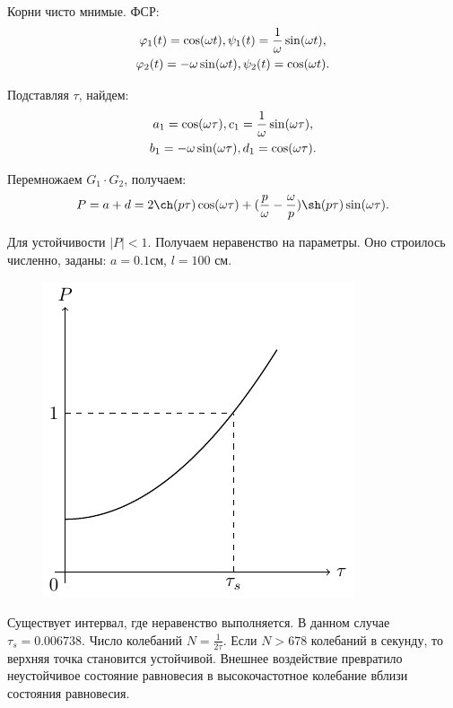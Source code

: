 Корни чисто мнимые. ФСР:
\begin{gather*}
	\phi_1(t)=\cos(\omega t), \psi_1(t)=\frac1{\omega}\sin(\omega t), \notag \\ 
	\phi_2(t)=-\omega \sin(\omega t), \psi_2(t)=\cos(\omega t).		
\end{gather*}

Подставляя $\tau$, найдем:
\begin{gather*}
	a_1=\cos(\omega \tau), c_1=\frac1{\omega}\sin(\omega \tau), \notag \\ 
	b_1=-\omega \sin(\omega \tau), d_1=\cos(\omega \tau).		
\end{gather*}

Перемножаем $G_1 \cdot G_2$, получаем:
\begin{gather*}
	P=a+d=2\ch(p \tau)\cos(\omega \tau)+(\frac{p}{\omega}-\frac{\omega}{p})\sh(p \tau)\sin(\omega \tau).		
\end{gather*}

Для устойчивости $|P|<1$. Получаем неравенство на параметры. Оно строилось численно, заданы: $a=0.1$см, $l=100$ см.

\begin{figure} 
	\vspace{0.1em}
	\centering
	\includegraphics[scale=1.1]{fig/fig47.pdf}
	\vspace{-0.25em}
\end{figure}

Существует интервал, где неравенство выполняется. В данном случае $\tau_s=0.006738$. Число колебаний $N=\frac{1}{2\tau}$. Если $N>678$ колебаний в секунду, то верхняя точка становится устойчивой. Внешнее воздействие превратило неустойчивое состояние равновесия в высокочастотное колебание вблизи состояния равновесия.

